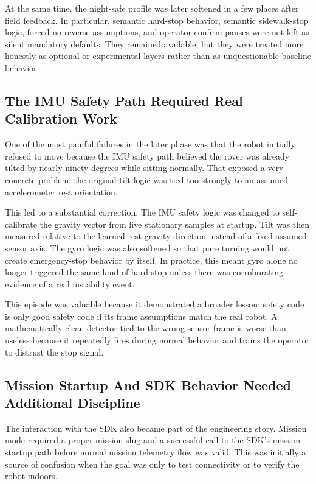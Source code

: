\documentclass[11pt]{article}
\begin{document}
At the same time, the night-safe profile was later softened in a few places after field feedback. In particular, semantic hard-stop behavior, semantic sidewalk-stop logic, forced no-reverse assumptions, and operator-confirm pauses were not left as silent mandatory defaults. They remained available, but they were treated more honestly as optional or experimental layers rather than as unquestionable baseline behavior.

\subsection{The IMU Safety Path Required Real Calibration Work}
One of the most painful failures in the later phase was that the robot initially refused to move because the IMU safety path believed the rover was already tilted by nearly ninety degrees while sitting normally. That exposed a very concrete problem: the original tilt logic was tied too strongly to an assumed accelerometer rest orientation.

This led to a substantial correction. The IMU safety logic was changed to self-calibrate the gravity vector from live stationary samples at startup. Tilt was then measured relative to the learned rest gravity direction instead of a fixed assumed sensor axis. The gyro logic was also softened so that pure turning would not create emergency-stop behavior by itself. In practice, this meant gyro alone no longer triggered the same kind of hard stop unless there was corroborating evidence of a real instability event.

This episode was valuable because it demonstrated a broader lesson: safety code is only good safety code if its frame assumptions match the real robot. A mathematically clean detector tied to the wrong sensor frame is worse than useless because it repeatedly fires during normal behavior and trains the operator to distrust the stop signal.

\subsection{Mission Startup And SDK Behavior Needed Additional Discipline}
The interaction with the SDK also became part of the engineering story. Mission mode required a proper mission slug and a successful call to the SDK's mission startup path before normal mission telemetry flow was valid. This was initially a source of confusion when the goal was only to test connectivity or to verify the robot indoors.
\end{document}
